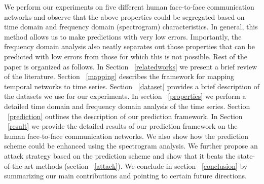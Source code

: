 We perform our experiments on five different human face-to-face communication networks 
and observe that the above properties could be segregated based on time domain and frequency domain (spectrogram) characteristics. 
In general, this method allows us to make predictions with very low errors.   
 Importantly, the frequency domain analysis also neatly separates out those properties that can be predicted with low errors from those for which this is not 
 possible.
Rest of the paper is organized as follows. In Section ~\ref{relatedworks} we present a brief review of the literature. 
Section ~\ref{mapping} describes the framework for mapping temporal networks to time series. 
Section ~\ref{dataset} provides a brief description of the datasets we use for 
our experiments.
  In section ~\ref{properties} we perform a detailed time domain and frequency domain analysis of the time series. 
Section ~\ref{prediction} outlines the description of our prediction framework. In Section ~\ref{result} we provide the detailed results of our prediction framework on the 
human face-to-face communication networks. We also show how the prediction scheme could be enhanced using the spectrogram analysis. We further 
propose an attack strategy based on the prediction scheme and show that it beats the state-of-the-art methods (section ~\ref{attack}). 
We conclude in section ~\ref{conclusion} by summarizing our main contributions and pointing to certain future directions.
\fi
\medskip
